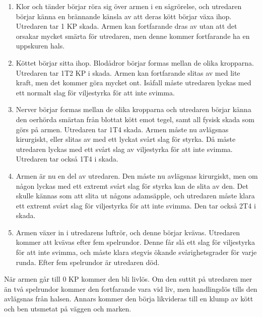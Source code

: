 \begin{enumerate}
	\item Klor och tänder börjar röra sig över armen i en sågrörelse, och utredaren börjar känna en brännande känsla av att deras kött börjar växa ihop. Utredaren tar 1 KP skada. Armen kan fortfarande dras av utan att det orsakar mycket smärta för utredaren, men denne kommer fortfarande ha en uppskuren hals.
	\item Köttet börjar sitta ihop. Blodådror börjar formas mellan de olika kropparna. Utredaren tar 1T2 KP i skada. Armen kan fortfarande slitas av med lite kraft, men det kommer göra mycket ont. Isåfall måste utredaren lyckas med ett normalt slag för viljestyrka för att inte svimma.
	\item Nerver börjar formas mellan de olika kropparna och utredaren börjar känna den oerhörda smärtan från blottat kött emot tegel, samt all fysisk skada som görs på armen. Utredaren tar 1T4 skada. Armen måste nu avlägsnas kirurgiskt, eller slitas av med ett lyckat svårt slag för styrka. Då måste utredaren lyckas med ett svårt slag av viljestyrka för att inte svimma. Utredaren tar också 1T4 i skada.
	\item Armen är nu en del av utredaren. Den måste nu avlägsnas kirurgiskt, men om någon lyckas med ett extremt svårt slag för styrka kan de slita av den. Det skulle kännas som att slita ut någons adamsäpple, och utredaren måste klara ett extremt svårt slag för viljestyrka för att inte svimma. Den tar också 2T4 i skada.
	\item Armen växer in i utredarens luftrör, och denne börjar kvävas. Utredaren kommer att kvävas efter fem spelrundor. Denne får slå ett slag för viljestyrka för att inte svimma, och måste klara stegvis ökande svårighetsgrader för varje runda. Efter fem spelrundor är utredaren död.
\end{enumerate}

När armen går till 0 KP kommer den bli livlös. Om den suttit på utredaren mer än två spelrundor kommer den fortfarande vara vid liv, men handlingslös tills den avlägsnas från halsen. Annars kommer den börja likvideras till en klump av kött och ben utsmetat på väggen och marken.


